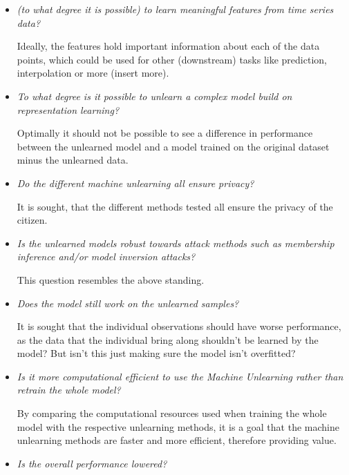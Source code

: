 \begin{itemize}
    \item \textit{(to what degree it is possible) to learn meaningful features from time series data?}

    Ideally, the features hold important information about each of the data points, which could be used for other (downstream) tasks like prediction, interpolation or more (insert more). 

    \item \textit{To what degree is it possible to unlearn a complex model build on representation learning?}

    Optimally it should not be possible to see a difference in performance between the unlearned model and a model trained on the original dataset minus the unlearned data. 

    \item \textit{Do the different machine unlearning all ensure privacy?}

    It is sought, that the different methods tested all ensure the privacy of the citizen.

    \item \textit{Is the unlearned models robust towards attack methods such as membership inference and/or model inversion attacks?}

    This question resembles the above standing.

    \item \textit{Does the model still work on the unlearned samples?}

    It is sought that the individual observations should have worse performance, as the data that the individual bring along shouldn't be learned by the model? But isn't this just making sure the model isn't overfitted? 

    \item \textit{Is it more computational efficient to use the Machine Unlearning rather than retrain the whole model?}

    By comparing the computational resources used when training the whole model with the respective unlearning methods, it is a goal that the machine unlearning methods are faster and more efficient, therefore providing value. 

    \item \textit{Is the overall performance lowered?}

\end{itemize}



